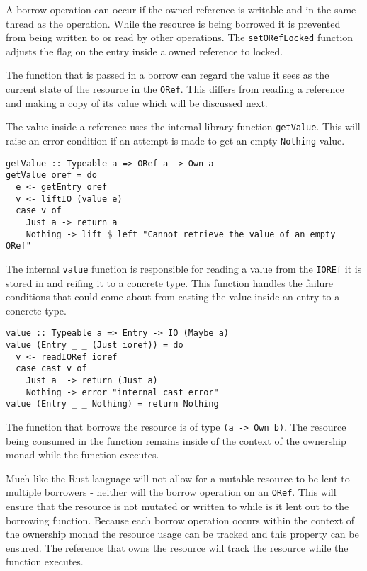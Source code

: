 \documentclass[onehalf,11pt]{beavtex}
\begin{document}
A borrow operation can occur if the owned reference is writable and
in the same thread as the operation.
While the resource is being borrowed it is prevented from being written to or
read by other operations. The \texttt{setORefLocked} function adjusts the flag
on the entry inside a owned reference to locked.

The function that is passed in a borrow can regard the value it sees as the
current state of the resource in the \texttt{ORef}. This differs from reading a
reference and making a copy of its value which will be discussed next.

The value inside a reference uses the internal library function
\texttt{getValue}. This will raise an error condition if an
attempt is made to get an empty \texttt{Nothing} value.

\begin{verbatim}
getValue :: Typeable a => ORef a -> Own a
getValue oref = do
  e <- getEntry oref
  v <- liftIO (value e)
  case v of
    Just a -> return a
    Nothing -> lift $ left "Cannot retrieve the value of an empty ORef"
\end{verbatim}

The internal \texttt{value} function is responsible for reading a value from
the \texttt{IOREf} it is stored in and reifing it to a concrete type.
This function handles the failure conditions that could come
about from casting the value inside an entry to a concrete type.

\begin{verbatim}
value :: Typeable a => Entry -> IO (Maybe a)
value (Entry _ _ (Just ioref)) = do
  v <- readIORef ioref
  case cast v of
    Just a  -> return (Just a)
    Nothing -> error "internal cast error"
value (Entry _ _ Nothing) = return Nothing
\end{verbatim}

The function that borrows the resource is of type \texttt{(a -> Own b)}. The
resource being consumed in the function remains inside of the context of the
ownership monad while the function executes. %

Much like the Rust language will not allow for a mutable resource to be lent to
multiple borrowers - neither will the borrow operation on an \texttt{ORef}.
This will ensure that the resource is not mutated or written to while is it lent
out to the borrowing function.
Because each borrow operation occurs within the context of the ownership monad
the resource usage can be tracked and this property can be ensured. The
reference that owns the resource will track the resource while the function
executes.
\end{document}
